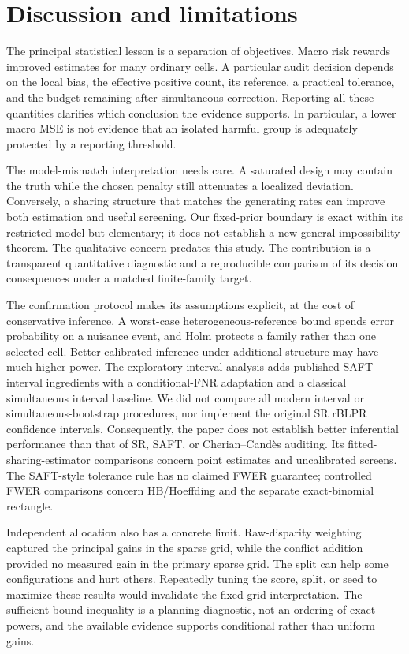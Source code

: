 \documentclass[Afour,sageh,times,doublespace]{sagej}
\begin{document}
\section{Discussion and limitations}\label{sec:discussion}
The principal statistical lesson is a separation of objectives. Macro risk rewards improved estimates for many ordinary cells. A particular audit decision depends on the local bias, the effective positive count, its reference, a practical tolerance, and the budget remaining after simultaneous correction. Reporting all these quantities clarifies which conclusion the evidence supports. In particular, a lower macro MSE is not evidence that an isolated harmful group is adequately protected by a reporting threshold.

The model-mismatch interpretation needs care. A saturated design may contain the truth while the chosen penalty still attenuates a localized deviation. Conversely, a sharing structure that matches the generating rates can improve both estimation and useful screening. Our fixed-prior boundary is exact within its restricted model but elementary; it does not establish a new general impossibility theorem. The qualitative concern predates this study. The contribution is a transparent quantitative diagnostic and a reproducible comparison of its decision consequences under a matched finite-family target.

The confirmation protocol makes its assumptions explicit, at the cost of conservative inference. A worst-case heterogeneous-reference bound spends error probability on a nuisance event, and Holm protects a family rather than one selected cell. Better-calibrated inference under additional structure may have much higher power. The exploratory interval analysis adds published SAFT interval ingredients with a conditional-FNR adaptation and a classical simultaneous interval baseline. We did not compare all modern interval or simultaneous-bootstrap procedures, nor implement the original SR rBLPR confidence intervals. Consequently, the paper does not establish better inferential performance than that of SR, SAFT, or Cherian--Cand\`es auditing. Its fitted-sharing-estimator comparisons concern point estimates and uncalibrated screens. The SAFT-style tolerance rule has no claimed FWER guarantee; controlled FWER comparisons concern HB/Hoeffding and the separate exact-binomial rectangle.

Independent allocation also has a concrete limit. Raw-disparity weighting captured the principal gains in the sparse grid, while the conflict addition provided no measured gain in the primary sparse grid. The split can help some configurations and hurt others. Repeatedly tuning the score, split, or seed to maximize these results would invalidate the fixed-grid interpretation. The sufficient-bound inequality is a planning diagnostic, not an ordering of exact powers, and the available evidence supports conditional rather than uniform gains.
\end{document}
